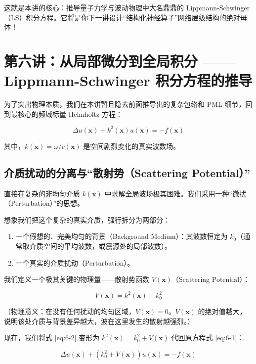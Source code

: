 \documentclass[12pt]{article}
\begin{document}
{这就是本讲的核心：推导量子力学与波动物理中大名鼎鼎的 Lippmann-Schwinger（LS）积分方程。它将是你下一讲设计“结构化神经算子”网络层级结构的绝对母体！

\section{第六讲：从局部微分到全局积分 —— Lippmann-Schwinger 积分方程的推导}

为了突出物理本质，我们在本讲暂且隐去前面推导出的复杂包络和 PML 细节，回到最核心的频域标量 Helmholtz 方程：

\begin{equation}
\Delta u(\mathbf{x}) + k^2(\mathbf{x}) u(\mathbf{x}) = -f(\mathbf{x})
\label{eq:6-1}
\end{equation}

其中，$k(\mathbf{x}) = \omega/c(\mathbf{x})$ 是空间剧烈变化的真实波数场。

\subsection{介质扰动的分离与“散射势（Scattering Potential）”}

直接在复杂的非均匀介质 $k(\mathbf{x})$ 中求解全局波场极其困难。我们采用一种“微扰（Perturbation）”的思想。

想象我们把这个复杂的真实介质，强行拆分为两部分：

\begin{enumerate}[leftmargin=2em]
    \item 一个假想的、完美均匀的背景（Background Medium）：其波数恒定为 $k_0$（通常取介质空间的平均波数，或震源处的局部波数）。
    \item 一个真实的介质扰动（Perturbation）。
\end{enumerate}

我们定义一个极其关键的物理量——散射势函数 $V(\mathbf{x})$（Scattering Potential）：

\begin{equation}
V(\mathbf{x}) = k^2(\mathbf{x}) - k_0^2
\label{eq:6-2}
\end{equation}

（物理意义：在没有任何扰动的均匀区域，$V(\mathbf{x}) = 0$。$V(\mathbf{x})$ 的绝对值越大，说明该处介质与背景差异越大，波在这里发生的散射越强烈。）

现在，我们将式 \eqref{eq:6-2} 变形为 $k^2(\mathbf{x}) = k_0^2 + V(\mathbf{x})$ 代回原方程式 \eqref{eq:6-1}：

\begin{equation}
\Delta u(\mathbf{x}) + (k_0^2 + V(\mathbf{x})) u(\mathbf{x}) = -f(\mathbf{x})
\label{eq:6-2-sub}
\end{equation}

}
\end{document}
